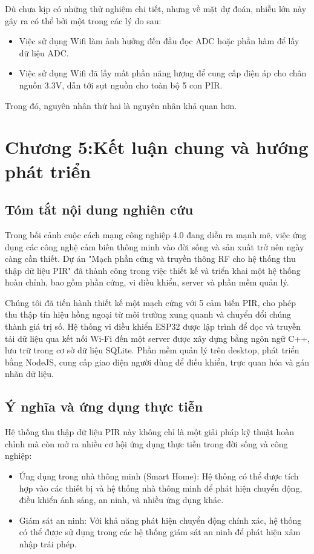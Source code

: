 \documentclass{article}
\begin{document}
Dù chưa kịp có những thử nghiệm chi tiết, nhưng về mặt dự đoán, nhiễu lớn này gây ra có thể bởi một trong các lý do sau:
\begin{itemize}
    \item Việc sử dụng Wifi làm ảnh hưởng đến đầu đọc ADC hoặc phần hàm để lấy dữ liệu ADC.
    \item Việc sử dụng Wifi đã lấy mất phần năng lượng để cung cấp điện áp cho chân nguồn 3.3V, dẫn tới sụt nguồn cho toàn bộ 5 con PIR.
\end{itemize}
Trong đó, nguyên nhân thứ hai là nguyên nhân khả quan hơn.
\cleardoublepage
\section*{Chương 5:Kết luận chung và hướng phát triển}
\setcounter{section}{5}
\setcounter{subsection}{0}

\subsection{Tóm tắt nội dung nghiên cứu}
Trong bối cảnh cuộc cách mạng công nghiệp 4.0 đang diễn ra mạnh mẽ, việc ứng dụng các công nghệ cảm biến thông minh vào đời sống và sản xuất trở nên ngày càng cần thiết. Dự án "Mạch phần cứng và truyền thông RF cho hệ thống thu thập dữ liệu PIR" đã thành công trong việc thiết kế và triển khai một hệ thống hoàn chỉnh, bao gồm phần cứng, vi điều khiển, server và phần mềm quản lý.

Chúng tôi đã tiến hành thiết kế một mạch cứng với 5 cảm biến PIR, cho phép thu thập tín hiệu hồng ngoại từ môi trường xung quanh và chuyển đổi chúng thành giá trị số. Hệ thống vi điều khiển ESP32 được lập trình để đọc và truyền tải dữ liệu qua kết nối Wi-Fi đến một server được xây dựng bằng ngôn ngữ C++, lưu trữ trong cơ sở dữ liệu SQLite. Phần mềm quản lý trên desktop, phát triển bằng NodeJS, cung cấp giao diện người dùng để điều khiển, trực quan hóa và gán nhãn dữ liệu.
\subsection{ Ý nghĩa và ứng dụng thực tiễn}
Hệ thống thu thập dữ liệu PIR này không chỉ là một giải pháp kỹ thuật hoàn chỉnh mà còn mở ra nhiều cơ hội ứng dụng thực tiễn trong đời sống và công nghiệp:
\begin{itemize}
    \item Ứng dụng trong nhà thông minh (Smart Home): Hệ thống có thể được tích hợp vào các thiết bị và hệ thống nhà thông minh để phát hiện chuyển động, điều khiển ánh sáng, an ninh, và nhiều ứng dụng khác.
    \item Giám sát an ninh: Với khả năng phát hiện chuyển động chính xác, hệ thống có thể được sử dụng trong các hệ thống giám sát an ninh để phát hiện xâm nhập trái phép.


\end{itemize}
\end{document}
